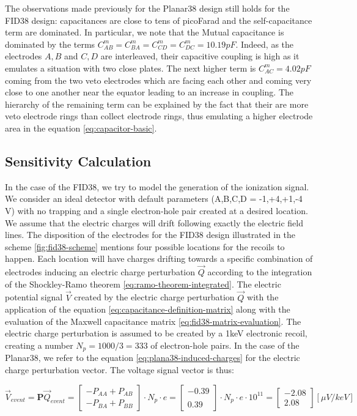 The observations made previously for the Planar38 design still holds for the FID38 design: capacitances are close to tens of picoFarad and the self-capacitance term are dominated. In particular, we note that the Mutual capacitance is dominated by the terms $C_{AB}^m=C_{BA}^m=C_{CD}^m=C_{DC}^m=10.19pF$. Indeed, as the electrodes $A,B$ and $C,D$ are interleaved, their capacitive coupling is high as it emulates a situation with two close plates. The next higher term is $C_{AC}^m=4.02pF$ coming from the two veto electrodes which are facing each other and coming very close to one another near the equator leading to an increase in coupling. The hierarchy of the remaining term can be explained by the fact that their are more veto electrode rings than collect electrode rings, thus emulating a higher electrode area in the equation \ref{eq:capacitor-basic}.

\subsection{Sensitivity Calculation}
\label{par:sensitivity-calculation}

In the case of the FID38, we try to model the generation of the ionization signal. We consider an ideal detector with default parameters (A,B,C,D = -1,+4,+1,-4 V) with no trapping and a single electron-hole pair created at a desired location. We assume that the electric charges will drift following exactly the electric field lines. The disposition of the electrodes for the FID38 design illustrated in the scheme \ref{fig:fid38-scheme} mentions four possible locations for the recoils to happen. Each location will have charges drifting towards a specific combination of electrodes inducing an electric charge perturbation $\vec{Q}$ according to the integration of the Shockley-Ramo theorem \ref{eq:ramo-theorem-integrated}. The electric potential signal $\vec{V}$ created by the electric charge perturbation $\vec{Q}$ with the application of the equation \ref{eq:capacitance-definition-matrix} along with the evaluation of the Maxwell capacitance matrix \ref{eq:fid38-matrix-evaluation}. The electric charge perturbation is assumed to be created by a 1keV electronic recoil, creating a number $N_p = 1000/3 = 333$ of electron-hole pairs.
In the case of the Planar38, we refer to the equation \ref{eq:plana38-induced-charges} for the electric charge perturbation vector. The voltage signal vector is thus:

\begin{equation}
\label{eq:planar38-sensitivity}
\vec{V}_{event} = \bm{P} \vec{Q}_{event} =
\begin{bmatrix}
- P_{AA} + P_{AB} \\ - P_{BA} + P_{BB}
\end{bmatrix}
\cdot N_p \cdot e
= 
\begin{bmatrix}
-0.39 \\  \\ 0.39
\end{bmatrix}
\cdot N_p \cdot e \cdot 10^{11}
= 
\begin{bmatrix}
-2.08 \\ 2.08 
\end{bmatrix}
[\mu V/keV]
\end{equation}

